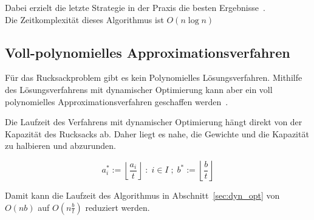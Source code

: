 \documentclass[12pt, a4paper, ngerman]{article}
\begin{document}
Dabei erzielt die letzte Strategie in der Praxis die besten Ergebnisse~\cite{paper102}.\\
Die Zeitkomplexität dieses Algorithmus ist \(O(n\log n)\)

\subsection{Voll-polynomielles Approximationsverfahren}

Für das Rucksackproblem gibt es kein Polynomielles Lösungsverfahren.
Mithilfe des Lösungsverfahrens mit dynamischer Optimierung
kann aber ein voll polynomielles Approximationsverfahren geschaffen werden~\cite{KombinatorischeOptimierung}.

Die Laufzeit des Verfahrens mit dynamischer Optimierung
hängt direkt von der Kapazität des Rucksacks ab.
Daher liegt es nahe, die Gewichte und die Kapazität zu halbieren und abzurunden.

\[
  a^*_i := \left\lfloor\frac{a_i}{t}\right\rfloor \;:\; i\in I\;;\; b^* := \left\lfloor\frac{b}{t}\right\rfloor
\]

Damit kann die Laufzeit des Algorithmus in Abschnitt~\ref{sec:dyn_opt}
von \(O(nb)\) auf \(O(n\frac{b}{t})\) reduziert werden.



\newpage
\printbibliography
\end{document}
